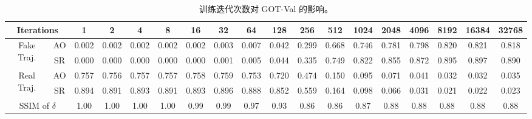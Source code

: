 \begin{table}
\centering
\begin{tabular}{cc|cccccccccccccccc} 
\toprule
\multicolumn{2}{c|}{Iterations}     & 1     & 2     & 4     & 8     & 16    & 32    & 64    & 128   & 256   & 512   & 1024  & 2048  & 4096  & 8192  & 16384 & 32768  \\ 
\midrule
\multirow{2}{*}{Fake Traj.} & AO    & 0.002 & 0.002 & 0.002 & 0.002 & 0.002 & 0.003 & 0.007 & 0.042 & 0.299 & 0.668 & 0.746 & 0.781 & 0.798 & 0.820 & 0.821 & 0.818  \\
                                 & SR    & 0.000 & 0.000 & 0.000 & 0.000 & 0.000 & 0.001 & 0.005 & 0.044 & 0.335 & 0.749 & 0.822 & 0.855 & 0.872 & 0.895 & 0.897 & 0.890  \\ 
\midrule
\multirow{2}{*}{Real Traj.} & AO    & 0.757 & 0.756 & 0.757 & 0.757 & 0.758 & 0.759 & 0.753 & 0.720 & 0.474 & 0.150 & 0.095 & 0.071 & 0.041 & 0.032 & 0.032 & 0.035  \\
                                 & SR    & 0.894 & 0.891 & 0.893 & 0.891 & 0.893 & 0.896 & 0.888 & 0.852 & 0.559 & 0.164 & 0.098 & 0.066 & 0.031 & 0.021 & 0.022 & 0.023  \\ 
\midrule
\multicolumn{2}{c|}{SSIM of $\delta$}                        & 1.00  & 1.00  & 1.00  & 1.00  & 0.99  & 0.99  & 0.97  & 0.93  & 0.86  & 0.86  & 0.87  & 0.88  & 0.88  & 0.88  & 0.88  & 0.88   \\
\bottomrule
\end{tabular}
\caption{训练迭代次数对 GOT-Val 的影响。}
\label{tab:iter}
\end{table}

